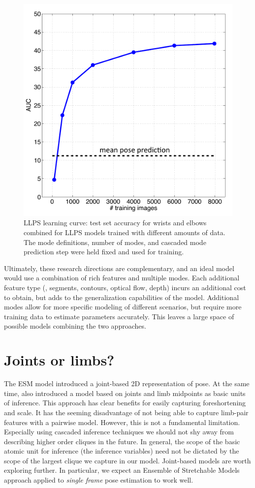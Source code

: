 \begin{figure}[htb!]
\centering
\includegraphics[width=0.70\linewidth]{figs/llps-learning-curve.pdf}
\caption[LLPS learning curve.]{
\label{fig:llps-learning-curve} LLPS learning curve: test set accuracy for 
wrists and elbows combined for LLPS models trained with different amounts of 
data.  The mode definitions, number of modes, and cascaded mode prediction step 
were held fixed and used for training.  }
\end{figure}


Ultimately, these research directions are complementary, and an ideal model 
would use a combination of rich features and multiple modes. Each additional 
feature type (\eg, segments, contours, optical flow, depth) incurs an 
additional cost to obtain, but adds to the generalization capabilities of the 
model. Additional modes allow for more specific modeling of different 
scenarios, but require more training data to estimate parameters accurately.  
This leaves a large space of possible models combining the two approaches.

\section{Joints or limbs?}

The ESM model introduced a joint-based 2D representation of pose.  At the same 
time, \citet{deva2011} also introduced a model based on joints and limb 
midpoints as basic units of inference.  This approach has clear benefits for 
easily capturing foreshortening and scale.  It has the seeming disadvantage of 
not being able to capture limb-pair features with a pairwise model.  However, 
this is not a fundamental limitation.  Especially using cascaded inference 
techniques we should not shy away from describing higher order cliques in the 
future.  In general, the scope of the basic atomic unit for inference (the 
inference variables) need not be dictated by the scope of the largest clique we 
capture in our model.  Joint-based models are worth exploring further.  In 
particular, we expect an Ensemble of Stretchable Models approach applied to 
{\em single frame} pose estimation to work well.


